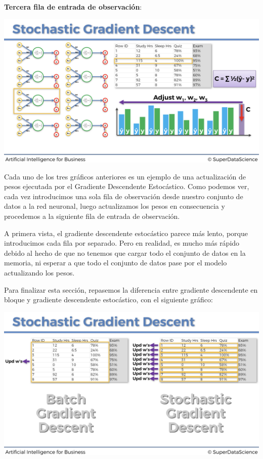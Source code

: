 \documentclass[]{book}
\begin{document}
\textbf{Tercera fila de entrada de observación}:

\includegraphics{Images/ANN_29.png}

Cada uno de los tres gráficos anteriores es un ejemplo de una actualización de pesos ejecutada por el Gradiente Descendente Estocástico. Como podemos ver, cada vez introducimos una sola fila de observación desde nuestro conjunto de datos a la red neuronal, luego actualizamos los pesos en consecuencia y procedemos a la siguiente fila de entrada de observación.

A primera vista, el gradiente descendente estocástico parece más lento, porque introducimos cada fila por separado. Pero en realidad, es mucho más rápido debido al hecho de que no tenemos que cargar todo el conjunto de datos en la memoria, ni esperar a que todo el conjunto de datos pase por el modelo actualizando los pesos.

Para finalizar esta sección, repasemos la diferencia entre gradiente descendente en bloque y gradiente descendente estocástico, con el siguiente gráfico:

\includegraphics{Images/ANN_31.png}
\end{document}
